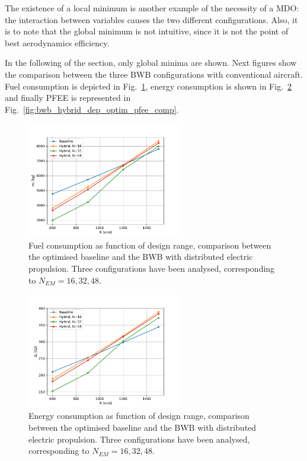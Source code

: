 The existence of a local minimum is another example of the necessity of a MDO: the interaction between variables causes the two different configurations. 
Also, it is to note that the global minimum is not intuitive, since it is not the point of best aerodynamics efficiency. 

In the following of the section, only global minima are shown. 
Next figures show the comparison between the three BWB configurations with conventional aircraft.
Fuel consumption is depicted in Fig.~\ref{fig:bwb_hybrid_dep_optim_mf_comp}, energy consumption is shown in Fig.~\ref{fig:bwb_hybrid_dep_optim_ec_comp} and finally PFEE is represented in Fig.~\ref{fig:bwb_hybrid_dep_optim_pfee_comp}. 
\begin{figure}[!h]
	\centering
	\includegraphics[keepaspectratio, width=0.6\textwidth]{images/chap4/bwb_hybrid_dep_optim_mf_comp}
	\caption{Fuel consumption as function of design range, comparison between the optimised baseline and the BWB with distributed electric propulsion. Three configurations have been analysed, corresponding to $N_{EM}=16,32,48$.}
	\label{fig:bwb_hybrid_dep_optim_mf_comp}
\end{figure}
\begin{figure}[!h]
	\centering
	\includegraphics[keepaspectratio, width=0.6\textwidth]{images/chap4/bwb_hybrid_dep_optim_ec_comp}
	\caption{Energy consumption as function of design range, comparison between the optimised baseline and the BWB with distributed electric propulsion. Three configurations have been analysed, corresponding to $N_{EM}=16,32,48$.}
	\label{fig:bwb_hybrid_dep_optim_ec_comp}
\end{figure}
